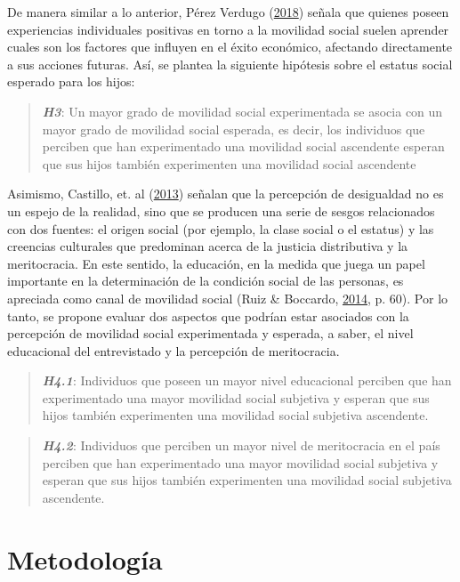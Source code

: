 \documentclass[
]{article}
\begin{document}
De manera similar a lo anterior, Pérez Verdugo
(\protect\hyperlink{ref-perezverdugo_Factores_2018}{2018}) señala que
quienes poseen experiencias individuales positivas en torno a la
movilidad social suelen aprender cuales son los factores que influyen en
el éxito económico, afectando directamente a sus acciones futuras. Así,
se plantea la siguiente hipótesis sobre el estatus social esperado para
los hijos:

\begin{quote}
\textbf{\emph{H3}}: Un mayor grado de movilidad social experimentada se
asocia con un mayor grado de movilidad social esperada, es decir, los
individuos que perciben que han experimentado una movilidad social
ascendente esperan que sus hijos también experimenten una movilidad
social ascendente
\end{quote}

Asimismo, Castillo, et. al
(\protect\hyperlink{ref-castillo_Educacion_2013}{2013}) señalan que la
percepción de desigualdad no es un espejo de la realidad, sino que se
producen una serie de sesgos relacionados con dos fuentes: el origen
social (por ejemplo, la clase social o el estatus) y las creencias
culturales que predominan acerca de la justicia distributiva y la
meritocracia. En este sentido, la educación, en la medida que juega un
papel importante en la determinación de la condición social de las
personas, es apreciada como canal de movilidad social (Ruiz \& Boccardo,
\protect\hyperlink{ref-ruiz_chilenos_2014}{2014}, p. 60). Por lo tanto,
se propone evaluar dos aspectos que podrían estar asociados con la
percepción de movilidad social experimentada y esperada, a saber, el
nivel educacional del entrevistado y la percepción de meritocracia.

\begin{quote}
\textbf{\emph{H4.1}}: Individuos que poseen un mayor nivel educacional
perciben que han experimentado una mayor movilidad social subjetiva y
esperan que sus hijos también experimenten una movilidad social
subjetiva ascendente.
\end{quote}

\begin{quote}
\textbf{\emph{H4.2}}: Individuos que perciben un mayor nivel de
meritocracia en el país perciben que han experimentado una mayor
movilidad social subjetiva y esperan que sus hijos también experimenten
una movilidad social subjetiva ascendente.
\end{quote}

\hypertarget{metodologuxeda}{%
\section{Metodología}\label{metodologuxeda}}
\end{document}
